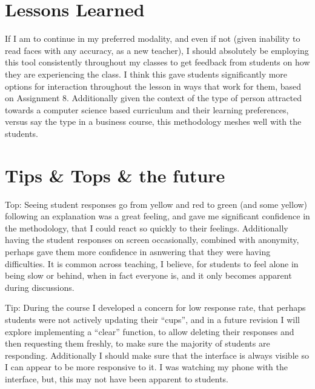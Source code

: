 \documentclass[paper=a4,justified,a4paper]{tufte-handout}
\begin{document}
\hypertarget{lessons-learned}{%
\section{Lessons Learned}\label{lessons-learned}}

If I am to continue in my preferred modality, and even if not (given
inability to read faces with any accuracy, as a new teacher), I should
absolutely be employing this tool consistently throughout my classes to
get feedback from students on how they are experiencing the class. I
think this gave students significantly more options for interaction
throughout the lesson in ways that work for them, based on Assignment 8.
Additionally given the context of the type of person attracted towards a
computer science based curriculum and their learning preferences, versus
say the type in a business course, this methodology meshes well with the
students.

\hypertarget{tips-tops-the-future}{%
\section{Tips \& Tops \& the future}\label{tips-tops-the-future}}

Top: Seeing student responses go from yellow and red to green (and some
yellow) following an explanation was a great feeling, and gave me
significant confidence in the methodology, that I could react so quickly
to their feelings. Additionally having the student responses on screen
occasionally, combined with anonymity, perhaps gave them more confidence
in asnwering that they were having difficulties. It is common across
teaching, I believe, for students to feel alone in being slow or behind,
when in fact everyone is, and it only becomes apparent during
discussions.

Tip: During the course I developed a concern for low response rate, that
perhaps students were not actively updating their ``cups'', and in a
future revision I will explore implementing a ``clear'' function, to
allow deleting their responses and then requesting them freshly, to make
sure the majority of students are responding. Additionally I should make
sure that the interface is always visible so I can appear to be more
responsive to it. I was watching my phone with the interface, but, this
may not have been apparent to students.


\end{document}
